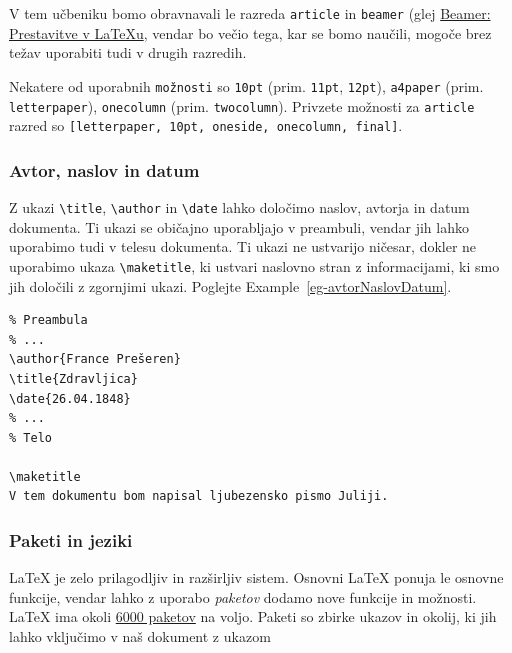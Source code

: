 V tem učbeniku bomo obravnavali le razreda \texttt{article} in \texttt{beamer} (glej \href{/latexbeamer}{Beamer: Prestavitve v LaTeXu}, vendar bo večio tega, kar se bomo naučili, mogoče brez težav uporabiti tudi v drugih razredih.

Nekatere od uporabnih \texttt{možnosti} so \texttt{10pt} (prim. \texttt{11pt}, \texttt{12pt}), \texttt{a4paper} (prim. \texttt{letterpaper}), \texttt{onecolumn} (prim. \texttt{twocolumn}).
Privzete možnosti za \texttt{article} razred so \texttt{[letterpaper, 10pt, oneside, onecolumn, final]}.

\subsubsection{Avtor, naslov in datum}\label{latexUvod_avtorNaslovDatum}

Z ukazi \texttt{{\textbackslash}title}, \texttt{{\textbackslash}author} in \texttt{{\textbackslash}date} lahko določimo naslov, avtorja in datum dokumenta.
Ti ukazi se običajno uporabljajo v preambuli, vendar jih lahko uporabimo tudi v telesu dokumenta.
Ti ukazi ne ustvarijo ničesar, dokler ne uporabimo ukaza \texttt{{\textbackslash}maketitle}, ki ustvari naslovno stran z informacijami, ki smo jih določili z zgornjimi ukazi. Poglejte Example~\ref{eg-avtorNaslovDatum}.

\begin{example}\label{eg-avtornaslovdatum}\begin{verbatim}
% Preambula
% ...
\author{France Prešeren}
\title{Zdravljica}
\date{26.04.1848}    
% ... 
% Telo

\maketitle
V tem dokumentu bom napisal ljubezensko pismo Juliji.

\end{verbatim}

\end{example}\subsubsection{Paketi in jeziki}\label{latexUvod_jezikPaketi}

LaTeX je zelo prilagodljiv in razširljiv sistem.
Osnovni LaTeX ponuja le osnovne funkcije, vendar lahko z uporabo \textit{paketov} dodamo nove funkcije in možnosti.
LaTeX ima okoli \href{https://www.ctan.org/pkg}{6000 paketov} na voljo.
Paketi so zbirke ukazov in okolij, ki jih lahko vključimo v naš dokument z ukazom

